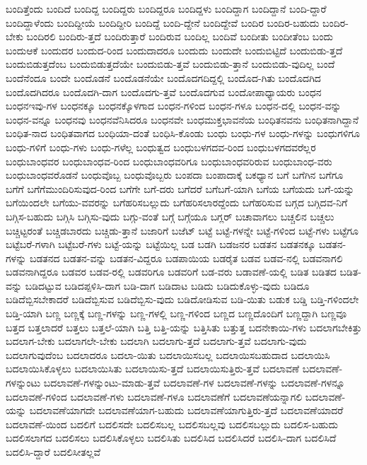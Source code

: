 {ಬಂದಿತ್ತೆಂದು
ಬಂದಿದೆ
ಬಂದಿದ್ದ
ಬಂದಿದ್ದರು
ಬಂದಿದ್ದರೂ
ಬಂದಿದ್ದಳು
ಬಂದಿದ್ದಾಗ
ಬಂದಿದ್ದಾನೆ
ಬಂದಿ-ದ್ದಾರೆ
ಬಂದಿದ್ದಾಳೆಂದು
ಬಂದಿದ್ದೀಯೆ
ಬಂದಿದ್ದೀರಿ
ಬಂದಿದ್ದೆ
ಬಂದಿ-ದ್ದೇನೆ
ಬಂದಿದ್ದೇವೆ
ಬಂದಿರ
ಬಂದಿರ-ಬಹುದು
ಬಂದಿರ-ಬೇಕು
ಬಂದಿರಲಿ
ಬಂದಿರು-ತ್ತದೆ
ಬಂದಿರುತ್ತಾರೆ
ಬಂದಿರುವ
ಬಂದಿಲ್ಲ
ಬಂದಿವೆ
ಬಂದೀತು
ಬಂದೀತೆಂಬ
ಬಂದು
ಬಂದುಆಕೆ
ಬಂದುದರ
ಬಂದುದ-ರಿಂದ
ಬಂದುದಾದರೂ
ಬಂದುದು
ಬಂದುದೇ
ಬಂದುಬಿಟ್ಟಿದೆ
ಬಂದುಬಿಡು-ತ್ತದೆ
ಬಂದುಬಿಡುತ್ತದೆಂಬ
ಬಂದುಬಿಡುತ್ತದೆಯೇ
ಬಂದುಬಿಡು-ತ್ತವೆ
ಬಂದುಬಿಡು-ತ್ತಾನೆ
ಬಂದುಬಿಡು-ವುದಿಲ್ಲ
ಬಂದೆ
ಬಂದೆನೆಂದೂ
ಬಂದೇ
ಬಂದೊಡನೆ
ಬಂದೊಡನೆಯೇ
ಬಂದೊದಗದಿದ್ದಲ್ಲಿ
ಬಂದೊದ-ಗಿತು
ಬಂದೊದಗಿದ
ಬಂದೊದಗಿದರೂ
ಬಂದೊದಗಿ-ದಾಗ
ಬಂದೊದಗು-ತ್ತವೆ
ಬಂದೊದಗುವ
ಬಂದೋಪಾಧ್ಯಾಯರು
ಬಂಧನ
ಬಂಧನಇವು-ಗಳ
ಬಂಧನಕ್ಕೂ
ಬಂಧನಕ್ಕೊಳಗಾದ
ಬಂಧನ-ಗಳಿಂದ
ಬಂಧನ-ಗಳೂ
ಬಂಧನ-ದಲ್ಲಿ
ಬಂಧನ-ವನ್ನು
ಬಂಧನ-ವನ್ನೂ
ಬಂಧನವು
ಬಂಧನವೆನಿಸಿದರೂ
ಬಂಧನವೇ
ಬಂಧಮುಕ್ತಭಾವನೆಯ
ಬಂಧಿತನವನು
ಬಂಧಿತನಾಗಿದ್ದಾನೆ
ಬಂಧಿತ-ನಾದ
ಬಂಧಿತವಾಗದ
ಬಂಧಿಯಾ-ದಂತೆ
ಬಂಧಿಸಿ-ಕೊಂಡು
ಬಂಧು
ಬಂಧು-ಗಳ
ಬಂಧು-ಗಳನ್ನು
ಬಂಧುಗಳಿಗೂ
ಬಂಧು-ಗಳಿಗೆ
ಬಂಧು-ಗಳು
ಬಂಧು-ಗಳೆಲ್ಲ
ಬಂಧುತ್ವದ
ಬಂಧುಬಳಗದವ-ರಿಂದ
ಬಂಧುಬಳಗದವರೆಲ್ಲರ
ಬಂಧುಬಾಂಧವರ
ಬಂಧುಬಾಂಧವ-ರಿಂದ
ಬಂಧುಬಾಂಧವರಿಗೂ
ಬಂಧುಬಾಂಧವರಿರುವ
ಬಂಧುಬಾಂಧ-ವರು
ಬಂಧುಬಾಂಧವರೊಡನೆ
ಬಂಧುವೊಬ್ಬ
ಬಂಧುವೊಬ್ಬರು
ಬಂಪದಾ
ಬಂಪಾದಾಕ್ಕೆ
ಬಕಧ್ಯಾನ
ಬಗೆ
ಬಗೆಗಿನ
ಬಗೆಗೂ
ಬಗೆಗೆ
ಬಗೆಗೆಮುಂದಿರಿಸುವುದ-ರಿಂದ
ಬಗೆಗೇ
ಬಗೆ-ದರು
ಬಗೆದರೆ
ಬಗೆಬಗೆ-ಯಾಗಿ
ಬಗೆಯ
ಬಗೆಯದು
ಬಗೆ-ಯನ್ನು
ಬಗೆಯಿಂದಲೇ
ಬಗೆಯು-ವವರನ್ನು
ಬಗೆಹರಿಸಬಲ್ಲುದು
ಬಗೆಹರಿಸಲಾರದ್ದೆಂದು
ಬಗೆಹರಿಸುವ
ಬಗ್ಗದ
ಬಗ್ಗಿದವ-ನಿಗೆ
ಬಗ್ಗಿಸ-ಬಹುದು
ಬಗ್ಗಿಸಿ
ಬಗ್ಗಿಸು-ವುದು
ಬಗ್ಗು-ವಂತೆ
ಬಗ್ಗೆ
ಬಗ್ಗೆಯೂ
ಬಗ್ಲರ್
ಬಚಾವಾಗಲು
ಬಚ್ಚಲಿನ
ಬಚ್ಚಲು
ಬಚ್ಚಿಟ್ಟರಂತೆ
ಬಚ್ಚಿಡಬಾರದು
ಬಚ್ಚಿಡು-ತ್ತಾನೆ
ಬಜಾರಿಗೆ
ಬಜೆಟ್
ಬಟ್ಟೆ
ಬಟ್ಟೆ-ಗಳನ್ನೇ
ಬಟ್ಟೆ-ಗಳಿಂದ
ಬಟ್ಟೆ-ಗಳು
ಬಟ್ಟೆಗೂ
ಬಟ್ಟೆಬರೆ-ಗಳಾಗಿ
ಬಟ್ಟೆಬರೆ-ಗಳು
ಬಟ್ಟೆ-ಯನ್ನು
ಬಟ್ಟೆಯಿಲ್ಲ
ಬಡ
ಬಡಗಿ
ಬಡಜನರ
ಬಡತನ
ಬಡತನಕ್ಕೂ
ಬಡತನ-ಗಳನ್ನು
ಬಡತನದ
ಬಡತನ-ವನ್ನು
ಬಡತನ-ವಿದ್ದರೂ
ಬಡಪಾಯಿಯ
ಬಡರೈತ
ಬಡವ
ಬಡವ-ನಲ್ಲಿ
ಬಡವನಾಗಲಿ
ಬಡವನಾಗಿದ್ದರೂ
ಬಡವರ
ಬಡವ-ರಲ್ಲಿ
ಬಡವರಿಗೂ
ಬಡವರಿಗೆ
ಬಡ-ವರು
ಬಡಾವಣೆ-ಯಲ್ಲಿ
ಬಡಿತ
ಬಡಿತದ
ಬಡಿತ-ವನ್ನು
ಬಡಿದಟ್ಟುವ
ಬಡಿದಪ್ಪಳಿಸಿ-ದಾಗ
ಬಡಿ-ದಾಗ
ಬಡಿದಾಟ
ಬಡಿದು
ಬಡಿದುಕೊಳ್ಳು-ವುದು
ಬಡಿದೂ
ಬಡಿದೆಬ್ಬಿಸಬೇಕಾದರೆ
ಬಡಿದೆಬ್ಬಿಸುವ
ಬಡಿದೆಬ್ಬಿಸು-ವುದು
ಬಡಿದೋಡಿಸುವ
ಬಡಿ-ಯಿತು
ಬಡುಕ
ಬಡ್ಡಿ
ಬಡ್ತಿ-ಗಳಿಂದಲೇ
ಬಡ್ತಿ-ಯಾಗಿ
ಬಣ್ಣ
ಬಣ್ಣಕ್ಕೆ
ಬಣ್ಣ-ಗಳನ್ನು
ಬಣ್ಣ-ಗಳಲ್ಲಿ
ಬಣ್ಣ-ಗಳಿಂದ
ಬಣ್ಣದ
ಬಣ್ಣದೊಂದಿಗೆ
ಬಣ್ಣದ್ದಾಗಿ
ಬಣ್ಣವೂ
ಬತ್ತದ
ಬತ್ತಲಾದರೆ
ಬತ್ತಲು
ಬತ್ತಲೆ-ಯಾಗಿ
ಬತ್ತಿ
ಬತ್ತಿ-ಯನ್ನು
ಬತ್ತಿಸಿತು
ಬತ್ತುತ್ತ
ಬದನೇಕಾಯಿ-ಗಳು
ಬದಲಾಗಬೇಕಿತ್ತು
ಬದಲಾಗ-ಬೇಕು
ಬದಲಾಗಲೇ-ಬೇಕು
ಬದಲಾಗಿ
ಬದಲಾಗು-ತ್ತದೆ
ಬದಲಾಗು-ತ್ತವೆ
ಬದಲಾಗು-ವುದು
ಬದಲಾಗುವುದೆಂಬ
ಬದಲಾದರೂ
ಬದಲಾ-ಯಿತು
ಬದಲಾಯಿಸಬಲ್ಲ
ಬದಲಾಯಿಸಬಹುದಾದ
ಬದಲಾಯಿಸಿ
ಬದಲಾಯಿಸಿಕೊಳ್ಳಲು
ಬದಲಾಯಿಸಿತು
ಬದಲಾಯಿಸು-ತ್ತದೆ
ಬದಲಾಯಿಸುತ್ತಿರು-ತ್ತವೆ
ಬದಲಾವಣೆ
ಬದಲಾವಣೆ-ಗಳನ್ನುಂಟು
ಬದಲಾವಣೆ-ಗಳನ್ನುಂಟು-ಮಾಡು-ತ್ತವೆ
ಬದಲಾವಣೆ-ಗಳ
ಬದಲಾವಣೆ-ಗಳನ್ನು
ಬದಲಾವಣೆ-ಗಳನ್ನೂ
ಬದಲಾವಣೆ-ಗಳಿಂದ
ಬದಲಾವಣೆ-ಗಳು
ಬದಲಾವಣೆ-ಗಳೂ
ಬದಲಾವಣೆಗೆ
ಬದಲಾವಣೆಯನ್ನಾಗಲಿ
ಬದಲಾವಣೆ-ಯನ್ನು
ಬದಲಾವಣೆಯಾಗದೇ
ಬದಲಾವಣೆಯಾಗ-ಬಹುದು
ಬದಲಾವಣೆಯಾಗುತ್ತಿರು-ತ್ತದೆ
ಬದಲಾವಣೆಯಾದರೆ
ಬದಲಾವಣೆ-ಯಿಂದ
ಬದಲಿಗೆ
ಬದಲಿಸದೇ
ಬದಲಿಸಬಲ್ಲ
ಬದಲಿಸಬಲ್ಲವು
ಬದಲಿಸಬಲ್ಲುದು
ಬದಲಿಸ-ಬಹುದು
ಬದಲಿಸಲಾಗದ
ಬದಲಿಸಲು
ಬದಲಿಸಿಕೊಳ್ಳಲು
ಬದಲಿಸಿತು
ಬದಲಿಸಿದ
ಬದಲಿಸಿದರೆ
ಬದಲಿಸಿ-ದಾಗ
ಬದಲಿಸಿದೆ
ಬದಲಿಸಿ-ದ್ದಾರೆ
ಬದಲಿಸೀತಲ್ಲವೆ
}
